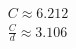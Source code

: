 \documentclass[preview]{standalone}
\begin{document}
\begin{align*}
C \approx 6.212 \\\frac{C}{d} \approx 3.106
\end{align*}
\end{document}

